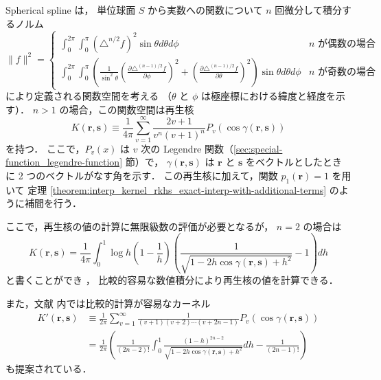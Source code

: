 Spherical spline \cite{Wahba1981} は，
単位球面 $S$ から実数への関数について
$n$ 回微分して積分するノルム
\begin{equation}
    \|f\|^2 =
    \begin{cases}
        \displaystyle
        \int_{0}^{2\pi} \int_{0}^{\pi} \left( \triangle^{n/2} f \right)^2 \sin{\theta} d\theta d\phi
         &
        \text{$n$ が偶数の場合}
        \\
        \displaystyle
        \int_{0}^{2\pi} \int_{0}^{\pi}
        \left(
        \frac{1}{\sin^2\theta} \left( \frac{\partial \triangle^{(n-1)/2} f}{\partial \phi} \right)^2
        + \left( \frac{\partial \triangle^{(n-1)/2} f}{\partial \theta} \right)^2
        \right)
        \sin{\theta} d\theta d\phi
         &
        \text{$n$ が奇数の場合}
    \end{cases}
\end{equation}
により定義される関数空間を考える
（$\theta$ と $\phi$ は極座標における緯度と経度を示す）．
$n > 1$ の場合，この関数空間は再生核
\begin{equation}
    K(\bm{r}, \bm{s}) \equiv
    \frac{1}{4\pi}
    \sum_{v=1}^{\infty} \frac{2 v + 1}{v^n (v + 1)^n} P_v (\cos{\gamma(\bm{r}, \bm{s})})
\end{equation}
を持つ．
ここで，$P_v(x)$ は $v$ 次の Legendre 関数（\ref{sec:special-function_legendre-function} 節）で，
$\gamma(\bm{r}, \bm{s})$ は $\bm{r}$ と $\bm{s}$ をベクトルとしたときに 2 つのベクトルがなす角を示す．
この再生核に加えて，関数 $p_1(\bm{r}) = 1$ を用いて
定理 \ref{theorem:interp_kernel_rkhs_exact-interp-with-additional-terms} のように補間を行う．

ここで，再生核の値の計算に無限級数の評価が必要となるが，
$n = 2$ の場合は
\begin{equation}
    K(\bm{r}, \bm{s}) =
    \frac{1}{4\pi} \int_{0}^{1} \log{h} \left( 1 - \frac{1}{h} \right)
    \left( \frac{1}{\sqrt{1 - 2 h \cos{\gamma(\bm{r}, \bm{s})} + h^2}} - 1 \right) dh
\end{equation}
と書くことができ \cite{Wahba1981}，
比較的容易な数値積分により再生核の値を計算できる．

また，文献 \cite{Wahba1981} 内では比較的計算が容易なカーネル
\begin{align}
    K'(\bm{r}, \bm{s})
     & \equiv
    \frac{1}{2\pi} \sum_{v=1}^{\infty}
    \frac{1}{(v+1) (v+2) \cdots (v + 2n - 1)} P_v (\cos{\gamma(\bm{r}, \bm{s})})
    \\
     & =
    \frac{1}{2\pi} \left( \frac{1}{(2n-2)!}
    \int_{0}^{1} \frac{(1-h)^{2n-2}}{\sqrt{1 - 2 h \cos{\gamma(\bm{r}, \bm{s})} + h^2}} dh
    - \frac{1}{(2n-1)!} \right)
\end{align}
も提案されている．
